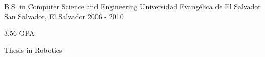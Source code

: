 

\begin{cventries}

  \cventry
    {B.S. in Computer Science and Engineering} %
    {Universidad Evangélica de El Salvador} %
    {San Salvador, El Salvador} %
    {2006 - 2010} %
    {
      \begin{cvitems} %
        \item {3.56 GPA}
        \item {Thesis in Robotics}
      \end{cvitems}
    }
    {}

\end{cventries}
